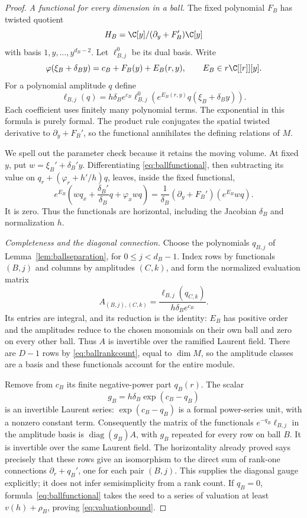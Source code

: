 \begin{proof}
\emph{A functional for every dimension in a ball.}
The fixed polynomial $F_B$ has twisted quotient
\[
 H_B=\C[y]/(\partial_y+F_B')\C[y]
\]
with basis $1,y,\ldots,y^{d_B-2}$. Let $\ell^0_{B,j}$ be its dual
basis. Write
\[
 \varphi(\xi_B+\delta_B y)=c_B+F_B(y)+E_B(r,y),
 \qquad E_B\in r\C[[r]][y].
\]
For a polynomial amplitude $q$ define
\begin{equation}\label{eq:ballfunctional}
 \ell_{B,j}(q)=h\delta_B e^{c_B}
   \ell^0_{B,j}\!\left(e^{E_B(r,y)}q(\xi_B+\delta_B y)\right).
\end{equation}
Each coefficient uses finitely many polynomial terms. The exponential
in this formula is purely formal. The product rule conjugates the
spatial twisted derivative to $\partial_y+F_B'$, so the functional
annihilates the defining relations of $M$.

We spell out the parameter check because it retains the moving volume.
At fixed $y$, put $w=\xi_B'+\delta_B'y$. Differentiating
\eqref{eq:ballfunctional}, then subtracting its value on
$q_r+(\varphi_r+h'/h)q$, leaves, inside the fixed functional,
\[
 e^{E_B}\left(wq_x+\frac{\delta_B'}{\delta_B}q+\varphi_xwq\right)
 =\frac1{\delta_B}(\partial_y+F_B')
                      \left(e^{E_B}wq\right).
\]
It is zero. Thus the functionals are horizontal, including the
Jacobian $\delta_B$ and normalization $h$.

\emph{Completeness and the diagonal connection.}
Choose the polynomials $q_{B,j}$ of
Lemma~\ref{lem:ballseparation}, for $0\leq j<d_B-1$.
Index rows by functionals $(B,j)$ and columns by amplitudes $(C,k)$,
and form the normalized evaluation matrix
\[
 A_{(B,j),(C,k)}=
   \frac{\ell_{B,j}(q_{C,k})}{h\delta_Be^{c_B}}.
\]
Its entries are integral, and its reduction is the identity:
$E_B$ has positive order and the amplitudes reduce to the chosen
monomials on their own ball and zero on every other ball. Thus $A$
is invertible over the ramified Laurent field. There are $D-1$ rows
by \eqref{eq:ballrankcount}, equal to $\dim M$, so the amplitude
classes are a basis and these functionals account for the entire module.

Remove from $c_B$ its finite negative-power part $q_B(r)$.
The scalar
\[
 g_B=h\delta_B\exp(c_B-q_B)
\]
is an invertible Laurent series: $\exp(c_B-q_B)$ is a formal
power-series unit, with a nonzero constant term. Consequently the
matrix of the functionals $e^{-q_B}\ell_{B,j}$ in the amplitude
basis is $\operatorname{diag}(g_B)A$, with $g_B$ repeated for every
row on ball $B$. It is invertible over the same Laurent field.
The horizontality already proved says precisely that these rows
give an isomorphism to the direct sum of rank-one connections
$\partial_r+q_B'$, one for each pair $(B,j)$. This supplies the diagonal
gauge explicitly; it does not infer semisimplicity from a rank count.
If $q_B=0$, formula~\eqref{eq:ballfunctional} takes the seed to a
series of valuation at least $v(h)+\rho_B$, proving
\eqref{eq:valuationbound}.


\end{proof}
